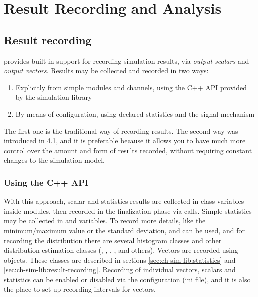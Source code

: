 \chapter{Result Recording and Analysis}
\label{cha:analyzing-simulation-results}


\section{Result recording}

{\opp} provides built-in support for recording simulation results, via
\textit{output scalars} and \textit{output vectors}. Results may be
collected and recorded in two ways:

\begin{enumerate}
  \item Explicitly from simple modules and channels, using the C++ API
    provided by the simulation library
  \item By means of configuration, using declared statistics and the
    signal mechanism
\end{enumerate}

The first one is the traditional way of recording results. The second way
was introduced in {\opp} 4.1, and it is preferable because it allows you
to have much more control over the amount and form of results recorded,
without requiring constant changes to the simulation model.

\subsection{Using the C++ API}

With this approach, scalar and statistics results are collected in class
variables inside modules, then recorded in the finalization phase via
 calls. Simple statistics may be collected in
 and  variables. To record more details, like the
minimum/maximum value or the standard deviation,  and
 can be used, and for recording the distribution
there are several histogram classes and other distribution estimation
classes (, ,
, , and others). Vectors are recorded
using  objects. These classes are described in sections
\ref{sec:ch-sim-lib:statistics} and \ref{sec:ch-sim-lib:result-recording}.
Recording of individual vectors, scalars and statistics can be enabled or
disabled via the configuration (ini file), and it is also the place to set
up recording intervals for vectors.


